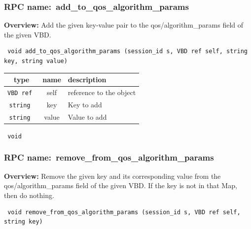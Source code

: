 \subsubsection{RPC name:~add\_to\_qos\_algorithm\_params}

{\bf Overview:} 
Add the given key-value pair to the qos/algorithm\_params field of the
given VBD.

\begin{verbatim} void add_to_qos_algorithm_params (session_id s, VBD ref self, string key, string value)\end{verbatim}



 
\vspace{0.3cm}
\begin{tabular}{|c|c|p{7cm}|}
 \hline
{\bf type} & {\bf name} & {\bf description} \\ \hline
{\tt VBD ref } & self & reference to the object \\ \hline 

{\tt string } & key & Key to add \\ \hline 

{\tt string } & value & Value to add \\ \hline 

\end{tabular}

\vspace{0.3cm}

{\tt 
void
}



\vspace{0.3cm}
\vspace{0.3cm}
\vspace{0.3cm}
\subsubsection{RPC name:~remove\_from\_qos\_algorithm\_params}

{\bf Overview:} 
Remove the given key and its corresponding value from the
qos/algorithm\_params field of the given VBD.  If the key is not in that
Map, then do nothing.

\begin{verbatim} void remove_from_qos_algorithm_params (session_id s, VBD ref self, string key)\end{verbatim}



